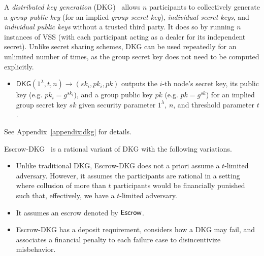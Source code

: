 \begin{definition}
A \textit{distributed key generation} (DKG)~\cite{pedersen1991threshold,gennaro1999secure} allows $n$ participants to collectively generate a \textit{group public key} (for an implied \textit{group secret key}), \textit{individual secret keys}, and \textit{individual public keys} without a trusted third party. It does so by running $n$ instances of VSS (with each participant acting as a dealer for its independent secret). Unlike secret sharing schemes, DKG can be used repeatedly for an unlimited number of times, as the group secret key does not need to be computed explicitly.
\begin{itemize}
    \item $\mathsf{DKG}(1^\lambda, t, n) \rightarrow (sk_i, pk_i, pk)$ outputs the $i$-th node's secret key, its public key (e.g. $pk_i = g^{sk_i}$), and a group public key $pk$ (e.g. $pk = g^{sk}$) for an implied group secret key $sk$ given security parameter $1^\lambda$, $n$, and threshold parameter $t$.
\end{itemize}
See Appendix~\ref{appendix:dkg} for details.
\end{definition}

\begin{definition}
Escrow-DKG~\cite{david2019rational} is a rational variant of DKG with the following variations.
\begin{itemize}
    \item Unlike traditional DKG, Escrow-DKG does not a priori assume a $t$-limited adversary. However, it assumes the participants are rational in a setting where collusion of more than $t$ participants would be financially punished such that, effectively, we have a $t$-limited adversary.
    \item It assumes an escrow denoted by $\mathsf{Escrow}$.
    \item Escrow-DKG has a deposit requirement, considers how a DKG may fail, and associates a financial penalty to each failure case to disincentivize misbehavior.
\end{itemize}
\end{definition}


